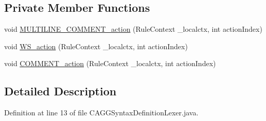 \subsection*{Private Member Functions}
\begin{DoxyCompactItemize}
\item 
void \hyperlink{classit_1_1emarolab_1_1cagg_1_1core_1_1language_1_1parser_1_1ANTLRInterface_1_1ANTLRGenerated_1_1CAGGSyntaxDefinitionLexer_a26d7a4a24c66f989d861ab262f6b7942}{M\-U\-L\-T\-I\-L\-I\-N\-E\-\_\-\-C\-O\-M\-M\-E\-N\-T\-\_\-action} (Rule\-Context \-\_\-localctx, int action\-Index)
\item 
void \hyperlink{classit_1_1emarolab_1_1cagg_1_1core_1_1language_1_1parser_1_1ANTLRInterface_1_1ANTLRGenerated_1_1CAGGSyntaxDefinitionLexer_a48e68c3f5039cb2ad1bcf0764c5cc80a}{W\-S\-\_\-action} (Rule\-Context \-\_\-localctx, int action\-Index)
\item 
void \hyperlink{classit_1_1emarolab_1_1cagg_1_1core_1_1language_1_1parser_1_1ANTLRInterface_1_1ANTLRGenerated_1_1CAGGSyntaxDefinitionLexer_a496dc739724196b953f27e16bb7d236d}{C\-O\-M\-M\-E\-N\-T\-\_\-action} (Rule\-Context \-\_\-localctx, int action\-Index)
\end{DoxyCompactItemize}


\subsection{Detailed Description}


Definition at line 13 of file C\-A\-G\-G\-Syntax\-Definition\-Lexer.\-java.



